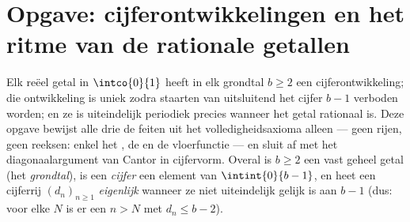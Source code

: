 \section{Opgave: cijferontwikkelingen en het ritme van de rationale getallen}

\begin{problem}
\label{pb:b1:reals:1}
Elk reëel getal in $\intco{0}{1}$ heeft in elk grondtal $b \geq 2$ een
cijferontwikkeling; die ontwikkeling is uniek zodra staarten van
uitsluitend het cijfer $b - 1$ verboden worden; en ze is uiteindelijk
periodiek precies wanneer het getal rationaal is. Deze opgave bewijst
alle drie de feiten uit het volledigheidsaxioma alleen --- geen rijen,
geen reeksen: enkel het , de  en de
vloerfunctie --- en sluit af met het diagonaalargument van Cantor in
cijfervorm. Overal is $b \geq 2$ een vast geheel getal (het
\emph{grondtal}), is een \emph{cijfer} een element van $\intint{0}{b-1}$,
en heet een cijferrij $(d_n)_{n \geq 1}$ \emph{eigenlijk} wanneer ze niet
uiteindelijk gelijk is aan $b - 1$ (dus: voor elke $N$ is er een $n > N$
met $d_n \leq b - 2$).


\end{problem}
